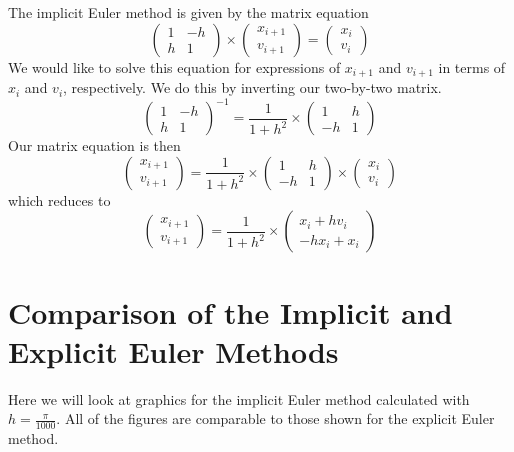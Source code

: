 \documentclass[12pt, letterpaper]{article}
\begin{document}
The implicit Euler method is given by the matrix equation $$\begin{pmatrix} 1 & -h \\ h & 1 \end{pmatrix} \times \left( \begin{array}{c} x_{i+1}\\v_{i+1} \end{array} \right) = \left( \begin{array}{c} x_i\\v_i \end{array} \right)$$
We would like to solve this equation for expressions of $x_{i+1}$ and $v_{i+1}$ in terms of $x_i$ and $v_i$, respectively. We do this by inverting our two-by-two matrix. $${\begin{pmatrix} 1 & -h \\ h & 1 \end{pmatrix}}^{-1} = \frac{1}{1+h^2} \times \begin{pmatrix} 1 & h \\ -h & 1 \end{pmatrix}$$
Our matrix equation is then $$\left( \begin{array}{c} x_{i+1}\\v_{i+1} \end{array} \right) = \frac{1}{1+h^2} \times \begin{pmatrix} 1 & h \\ -h & 1 \end{pmatrix} \times \left( \begin{array}{c} x_i\\v_i \end{array} \right)$$
which reduces to $$\left( \begin{array}{c} x_{i+1}\\v_{i+1} \end{array} \right) = \frac{1}{1+h^2} \times \left( \begin{array}{c} x_i + hv_i\\-hx_i + x_i \end{array} \right)$$

\section{Comparison of the Implicit and Explicit Euler Methods}

Here we will look at graphics for the implicit Euler method calculated with $h=\frac{\pi}{1000}$. All of the figures are comparable to those shown for the explicit Euler method.
\end{document}
